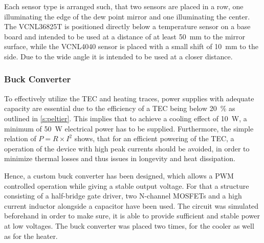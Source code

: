 Each sensor type is arranged such, that two sensors are placed in a row, one illuminating the edge of the dew point mirror and one illuminating the center. The VCNL36825T is positioned directly below a temperature sensor on a base board and intended to be used at a distance of at least \qty{50}{\mm} to the mirror surface, while the VCNL4040 sensor is placed with a small shift of \qty{10}{\mm} to the side. Due to the wide angle it is intended to be used at a closer distance.

\subsubsection{Buck Converter}
To effectively utilize the \gls{TEC} and heating traces, power supplies with adequate capacity are essential due to the efficiency of a \gls{TEC} being below \qty{20}{\percent} as outlined in \cref{s:peltier}. This implies that to achieve a cooling effect of \qty{10}{\watt}, a minimum of \qty{50}{\watt} electrical power has to be supplied. Furthermore, the simple relation of $P = R \times I^2$ shows, that for an efficient powering of the \gls{TEC}, a  operation of the device with high peak currents should be avoided, in order to minimize thermal losses and thus issues in longevity and heat dissipation.

Hence, a custom buck converter has been designed, which allows a \gls{PWM} controlled operation while giving a stable output voltage. For that a structure consisting of a half-bridge gate driver, two N-channel MOSFETs and a high current inductor alongside a capacitor have been used. The circuit was simulated beforehand in order to make sure, it is able to provide sufficient and stable power at low voltages. The buck converter was placed two times, for the cooler as well as for the heater.

